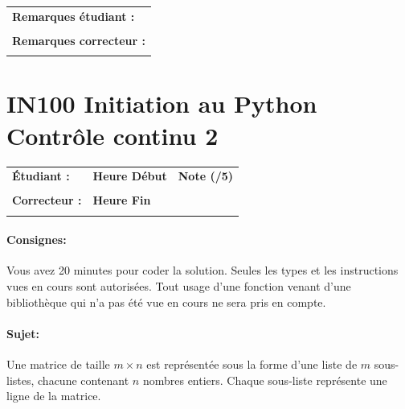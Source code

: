\documentclass[a4paper,11pt]{article}
\begin{document}
\vspace{0.5 cm}
\begin{table}[h!]
\centering
\renewcommand{\arraystretch}{1.4} %
\begin{tabular}{|p{15cm}|}
\hline
\textbf{Remarques étudiant :}    \\
 \\
\hline
\textbf{Remarques correcteur :}  \\
 \\
\hline
\end{tabular}
\end{table}


\newpage


\section*{\center IN100 Initiation au Python\\
Contrôle continu 2}

\vspace{0.5 cm}

\begin{table}[h!]
\centering
\renewcommand{\arraystretch}{1.4} %
\begin{tabular}{|p{10cm}|p{3cm}|p{2cm}|}
\hline
\textbf{Étudiant :} & \textbf{Heure Début }  & \textbf{Note (/5) }  \\
& & \\
\hline
\textbf{Correcteur :} & \textbf{Heure Fin } & \\
& & \\
\hline

\hline
\end{tabular}
\end{table}
\vspace{-0.4 cm}
\paragraph*{Consignes:} Vous avez 20 minutes pour coder la solution. Seules les types et les instructions vues en cours sont autorisées. Tout usage d'une fonction 
venant d'une bibliothèque qui n'a pas été vue en cours ne sera pris en compte. 


\vspace{-0.2 cm}
\paragraph*{Sujet:}


Une matrice de taille $m \times n$ est représentée sous la forme d'une liste de $m$ sous-listes, chacune contenant $n$ nombres entiers. Chaque sous-liste représente une ligne de la matrice.
\end{document}
